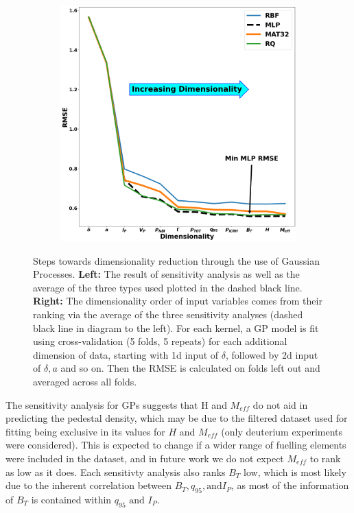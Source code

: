 \documentclass[a4paper, twoside, final, 12pt]{article}
\begin{document}
{\begin{figure}
\begin{subfigure}{0.48\linewidth}
	\end{subfigure}\hfill
	\begin{subfigure}{0.48\linewidth}
		\centering
		\includegraphics[scale=0.2]{ ./src/final_GP_dim_v2}
	\end{subfigure}
	\caption{Steps towards dimensionality reduction through the use of Gaussian Processes. \textbf{Left:} The result of sensitivity analysis as well as the average of the three types used plotted in the dashed black line. \textbf{Right:} The dimensionality order of input variables comes from their ranking via the average of the three sensitivity analyses (dashed black line in diagram to the left). For each kernel, a GP model is fit using cross-validation (5 folds, 5 repeats) for each additional dimension of data, starting with 1d input of $\delta$, followed by 2d input of $\delta, a$ and so on. Then the RMSE is calculated on folds left out and averaged across all folds. } \label{fig:GP_dim}
\end{figure}
The sensitivity analysis for GPs suggests that H and $M_{eff}$ do not aid in predicting the pedestal density, which may be due to the filtered dataset used for fitting being exclusive in its values for $H$ and $M_{eff}$ (only deuterium experiments were considered). This is expected to change if a wider range of fuelling elements were included in the dataset, and in future work we do not expect $M_{eff}$ to rank as low as it does. Each sensitivty analysis also ranks $B_T$ low, which is most likely due to the inherent correlation between $B_T, q_{95}, \text{and} I_P$, as most of the information of $B_T$ is contained within $q_{95} \text{ and } I_P$. 

}
\end{document}
